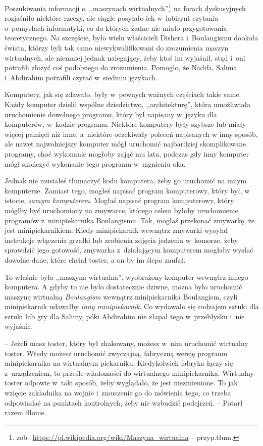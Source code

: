 \documentclass[oneside,polish,11pt,sfheadings]{mwbk}
\begin{document}
Poszukiwania informacji o~,,maszynach
wirtualnych''\footnote{zob.~\url{https://pl.wikipedia.org/wiki/Maszyna\_wirtualna}
-- przyp.tłum.} na forach dyskusyjnych rozjaśniło niektóre rzeczy, ale
ciągle posyłało ich w~labirynt czytania o~pomysłach informatyki, co do
których żadne nie miało przygotowania teoretycznego. Na szczęście, było
wielu właścicieli Dishera i~Boulangismu dookoła świata, którzy byli tak
samo niewykwalifikowani do zrozumienia maszyn wirtualnych, ale niemniej
jednak nalegający, żeby ktoś im wyjaśnił, stąd i~oni potrafili złożyć
coś podobnego do zrozumienia. Pomogło, że Nadifa, Salima i~Abdirahim
potrafili czytać w~siedmiu językach.

Komputery, jak się zdawało, były w~pewnych ważnych częściach takie same.
Każdy komputer dzielił wspólne dziedzictwo, ,,architekturę'', która
umożliwiała uruchomienie dowolnego programu, który był napisany w~języku
dla komputerów, w~kodzie programu. Niektóre komputery były szybsze lub
miały więcej pamięci niż inne, a~niektóre oczekiwały poleceń napisanych
w inny sposób, ale nawet najwolniejszy komputer mógł uruchomić
najbardziej skomplikowane programy, choć wykonanie mogłoby zająć mu
lata, podczas gdy inny komputer mógł skończyć wykonanie tego programu w~mgnieniu oka.

Jednak nie musiałeś tłumaczyć kodu komputera, żeby go uruchomić na innym
komputerze. Zamiast tego, mogłeś napisać program komputerowy, który był,
w istocie, \textit{samym komputerem}. Mogłaś napisać program komputerowy,
który mógłby być uruchomiony na zmywarce, którego celem byłoby
uruchomienie programów z~minipiekarnika Boulangismu. Tak, mogłaś
przekonać zmywarkę, że jest minipiekarnikiem. Kiedy minipiekarnik
wewnątrz zmywarki wysyłał instrukcje włączenia grzałki lub zrobienia
zdjęcia jedzenia w~komorze, żeby sprawdzić jego gotowość, zmywarka z~działającym komputerem mogłaby wysłać dowolne dane, które chciał toster,
a on by im ślepo zaufał.

To właśnie była ,,maszyna wirtualna'', wyobrażony komputer wewnątrz
innego komputera. A gdyby to nie było dostatecznie dziwne, można było
uruchomić maszynę wirtualną \textit{Boulangism} wewnątrz minipiekarnika
Boulangism, czyli minipiekarnik udawałby \textit{inny minipiekarnik}. Co
wydawało się rodzajem sztuki dla sztuki lub gry dla Salimy, póki
Abdirahim nie złapał tego w~przebłysku i~nie wyjaśnił.

-- Jeżeli masz toster, który był zhakowany, możesz w~nim uruchomić
wirtualny toster. Wtedy możesz uruchomić zwyczajną, fabryczną wersję
programu minipiekarnika na wirtualnym piekarniku. Kiedykolwiek fabryka
łączy się z~urządzeniem, to prześle wiadomości do wirtualnego
minipiekarnika. Wirtualny toster odpowie w~taki sposób, żeby wyglądało,
że jest niezmienione. To jak wzięcie zakładnika na wojnie i~zmuszenie go
do mówienia tego, co trzeba odpowiadać na punktach kontrolnych, żeby nie
wzbudzić podejrzeń. -- Potarł razem dłonie.
\end{document}

